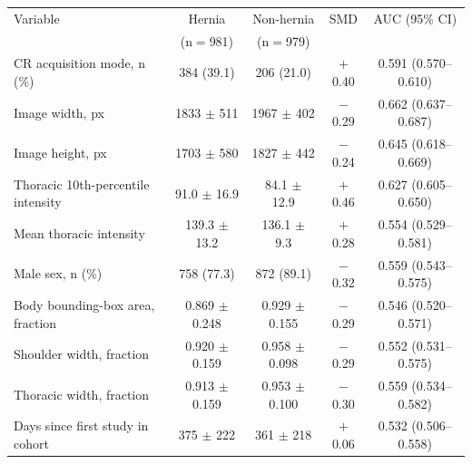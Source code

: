 \begin{tabular}{lccc c}
\toprule
Variable & Hernia & Non-hernia & SMD & AUC (95\% CI) \\
& (n$=$981) & (n$=$979) & & \\
\midrule
CR acquisition mode, n (\%) & 384 (39.1) & 206 (21.0) & $+$0.40 & 0.591 (0.570--0.610) \\
Image width, px & 1833 $\pm$ 511 & 1967 $\pm$ 402 & $-$0.29 & 0.662 (0.637--0.687) \\
Image height, px & 1703 $\pm$ 580 & 1827 $\pm$ 442 & $-$0.24 & 0.645 (0.618--0.669) \\
Thoracic 10th-percentile intensity & 91.0 $\pm$ 16.9 & 84.1 $\pm$ 12.9 & $+$0.46 & 0.627 (0.605--0.650) \\
Mean thoracic intensity & 139.3 $\pm$ 13.2 & 136.1 $\pm$ 9.3 & $+$0.28 & 0.554 (0.529--0.581) \\
Male sex, n (\%) & 758 (77.3) & 872 (89.1) & $-$0.32 & 0.559 (0.543--0.575) \\
Body bounding-box area, fraction & 0.869 $\pm$ 0.248 & 0.929 $\pm$ 0.155 & $-$0.29 & 0.546 (0.520--0.571) \\
Shoulder width, fraction & 0.920 $\pm$ 0.159 & 0.958 $\pm$ 0.098 & $-$0.29 & 0.552 (0.531--0.575) \\
Thoracic width, fraction & 0.913 $\pm$ 0.159 & 0.953 $\pm$ 0.100 & $-$0.30 & 0.559 (0.534--0.582) \\
Days since first study in cohort & 375 $\pm$ 222 & 361 $\pm$ 218 & $+$0.06 & 0.532 (0.506--0.558) \\
\bottomrule
\end{tabular}
